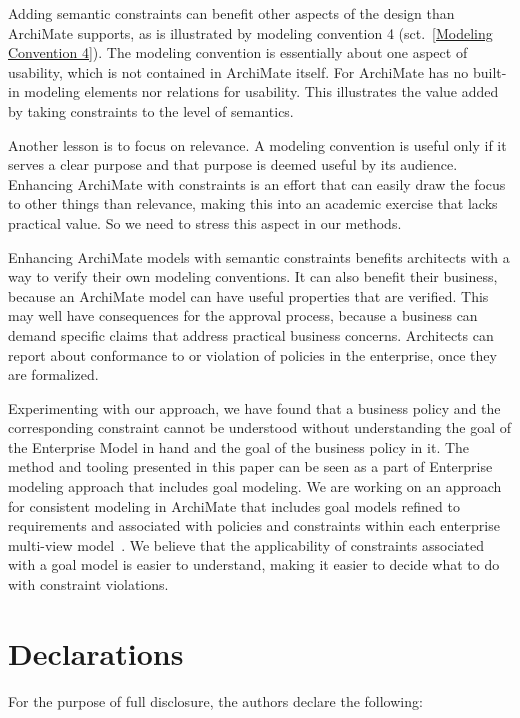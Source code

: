 \documentclass[sn-vancouver]{sn-jnl}%
\theoremstyle{thmstyleone}%
\theoremstyle{thmstyletwo}%
\theoremstyle{thmstylethree}%
\begin{document}
Adding semantic constraints can benefit other aspects of the design than ArchiMate supports,
as is illustrated by modeling convention 4 (sct.~\ref{Modeling Convention 4}).
The modeling convention is essentially about one aspect of usability, which is not contained in ArchiMate itself.
For ArchiMate has no built-in modeling elements nor relations for usability.
This illustrates the value added by taking constraints to the level of semantics.

Another lesson is to focus on relevance.
A modeling convention is useful only if it serves a clear purpose and that purpose is deemed useful by its audience.
Enhancing ArchiMate with constraints is an effort that can easily draw the focus to other things than relevance,
making this into an academic exercise that lacks practical value.
So we need to stress this aspect in our methods.

Enhancing ArchiMate models with semantic constraints benefits architects with a way to verify their own modeling conventions.
It can also benefit their business, because an ArchiMate model can have useful properties that are verified.
This may well have consequences for the approval process, because a business can demand specific claims that address practical business concerns.
Architects can report about conformance to or violation of policies in the enterprise, once they are formalized.

Experimenting with our approach, we have found that a business policy and the corresponding constraint cannot be understood 
without understanding the goal of the Enterprise Model in hand and the goal of the business policy in it.
The method and tooling presented in this paper can be seen as a part of Enterprise modeling approach that includes goal modeling.
We are working on an approach for consistent modeling in ArchiMate that includes goal models 
refined to requirements and associated with policies and constraints within each enterprise multi-view model~\cite{severin2022}.
We believe that the applicability of constraints associated with a goal model is easier to understand,
making it easier to decide what to do with constraint violations.

\backmatter


\section*{Declarations}
For the purpose of full disclosure, the authors declare the following:
\end{document}
